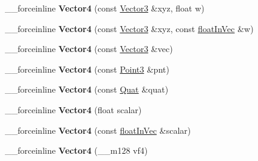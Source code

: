 \begin{DoxyCompactItemize}
\item 
\hypertarget{classVectormath_1_1Aos_1_1Vector4_a354f3df8c2b5872e8d1512f68f7b6a99}{\-\_\-\-\_\-forceinline {\bfseries Vector4} (const \hyperlink{classVectormath_1_1Aos_1_1Vector3}{Vector3} \&xyz, float w)}\label{classVectormath_1_1Aos_1_1Vector4_a354f3df8c2b5872e8d1512f68f7b6a99}

\item 
\hypertarget{classVectormath_1_1Aos_1_1Vector4_a6db8e4fc6f962b088c44ab536e46941a}{\-\_\-\-\_\-forceinline {\bfseries Vector4} (const \hyperlink{classVectormath_1_1Aos_1_1Vector3}{Vector3} \&xyz, const \hyperlink{classVectormath_1_1floatInVec}{float\-In\-Vec} \&w)}\label{classVectormath_1_1Aos_1_1Vector4_a6db8e4fc6f962b088c44ab536e46941a}

\item 
\hypertarget{classVectormath_1_1Aos_1_1Vector4_a5d53482f3013462ccbfb880ff9ae7035}{\-\_\-\-\_\-forceinline {\bfseries Vector4} (const \hyperlink{classVectormath_1_1Aos_1_1Vector3}{Vector3} \&vec)}\label{classVectormath_1_1Aos_1_1Vector4_a5d53482f3013462ccbfb880ff9ae7035}

\item 
\hypertarget{classVectormath_1_1Aos_1_1Vector4_aeed94483ef782921c06d4c9f579b5ac2}{\-\_\-\-\_\-forceinline {\bfseries Vector4} (const \hyperlink{classVectormath_1_1Aos_1_1Point3}{Point3} \&pnt)}\label{classVectormath_1_1Aos_1_1Vector4_aeed94483ef782921c06d4c9f579b5ac2}

\item 
\hypertarget{classVectormath_1_1Aos_1_1Vector4_af9ca30452a0a986c536f48fc7daab042}{\-\_\-\-\_\-forceinline {\bfseries Vector4} (const \hyperlink{classVectormath_1_1Aos_1_1Quat}{Quat} \&quat)}\label{classVectormath_1_1Aos_1_1Vector4_af9ca30452a0a986c536f48fc7daab042}

\item 
\hypertarget{classVectormath_1_1Aos_1_1Vector4_a9deadeb48bfc13068127137e39473c27}{\-\_\-\-\_\-forceinline {\bfseries Vector4} (float scalar)}\label{classVectormath_1_1Aos_1_1Vector4_a9deadeb48bfc13068127137e39473c27}

\item 
\hypertarget{classVectormath_1_1Aos_1_1Vector4_a0094cc14efef1ba86bea5a7e02e0bae2}{\-\_\-\-\_\-forceinline {\bfseries Vector4} (const \hyperlink{classVectormath_1_1floatInVec}{float\-In\-Vec} \&scalar)}\label{classVectormath_1_1Aos_1_1Vector4_a0094cc14efef1ba86bea5a7e02e0bae2}

\item 
\hypertarget{classVectormath_1_1Aos_1_1Vector4_aa2b082ef657e7e850973ba7ef1f14af0}{\-\_\-\-\_\-forceinline {\bfseries Vector4} (\-\_\-\-\_\-m128 vf4)}\label{classVectormath_1_1Aos_1_1Vector4_aa2b082ef657e7e850973ba7ef1f14af0}


\end{DoxyCompactItemize}
